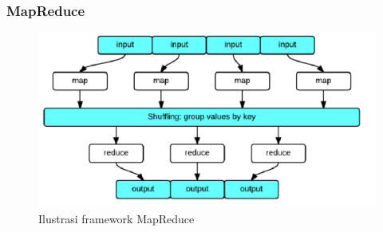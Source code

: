 		
				
\subsubsection{MapReduce}

\begin{figure}[h]
	\centering
	\includegraphics[scale=0.43]{GambarIO/map_reduce}
	\caption[Ilustrasi framework MapReduce]{Ilustrasi framework MapReduce \cite{Lam:2010:HA:1965594}}
	\label{fig:map_reduce}
\end{figure}
		
